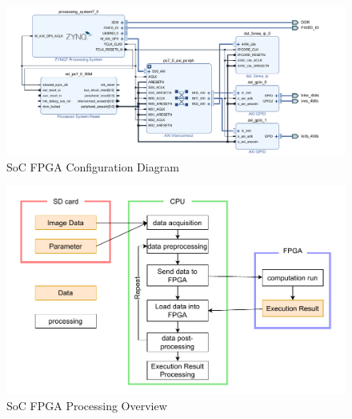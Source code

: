 \documentclass[conference]{IEEEtran}
\begin{document}
\begin{figure}[tb]
  \begin{center}
    \includegraphics[width=0.98\columnwidth]{figures/SoC_1.png}
  \end{center}
  \caption{SoC FPGA Configuration Diagram}
  \label{fig:2-2-4-1}
\end{figure}

\begin{figure}[tb]
  \begin{center}
    \includegraphics[width=0.98\columnwidth]{figures/SoC_2.pdf}
  \end{center}
  \caption{SoC FPGA Processing Overview}
  \label{fig:2-2-4-2}
\end{figure}
\end{document}
